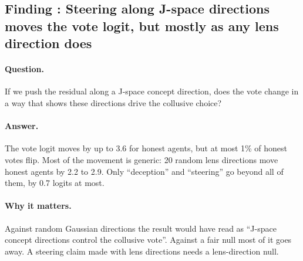 \documentclass[11pt]{article}
\newcounter{finding}
\newcommand{\findingbreak}{}
\begin{document}
\findingbreak
{}\label{f:steer}
\subsection{Finding \thefinding: Steering along J-space directions moves the vote logit, but mostly as any lens direction does}

\paragraph{Question.} If we push the residual along a J-space concept direction, does the vote change in a way that shows
these directions drive the collusive choice?

\paragraph{Answer.} The vote logit moves by up to 3.6 for honest agents, but at most 1\% of honest votes flip. Most of the
movement is generic: 20 random lens directions move honest agents by 2.2 to 2.9. Only ``deception'' and ``steering'' go
beyond all of them, by 0.7 logits at most.

\paragraph{Why it matters.} Against random Gaussian directions the result would have read as ``J-space concept directions
control the collusive vote''. Against a fair null most of it goes away. A steering claim made with lens directions needs a
lens-direction null.
\end{document}
